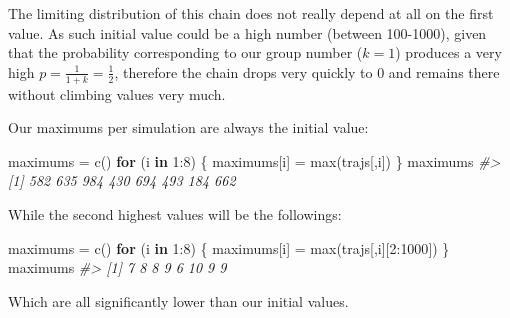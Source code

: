 \documentclass[
]{article}
\newenvironment{Shaded}{\begin{snugshade}}{\end{snugshade}}
\newcommand{\CommentTok}[1]{\textcolor[rgb]{0.56,0.35,0.01}{\textit{#1}}}
\newcommand{\ControlFlowTok}[1]{\textcolor[rgb]{0.13,0.29,0.53}{\textbf{#1}}}
\newcommand{\DecValTok}[1]{\textcolor[rgb]{0.00,0.00,0.81}{#1}}
\newcommand{\FunctionTok}[1]{\textcolor[rgb]{0.00,0.00,0.00}{#1}}
\newcommand{\NormalTok}[1]{#1}
\newcommand{\OtherTok}[1]{\textcolor[rgb]{0.56,0.35,0.01}{#1}}
\newcommand{\SpecialCharTok}[1]{\textcolor[rgb]{0.00,0.00,0.00}{#1}}
\begin{document}
The limiting distribution of this chain does not really depend at all on
the first value. As such initial value could be a high number (between
100-1000), given that the probability corresponding to our group number
(\(k=1\)) produces a very high \(p=\frac{1}{1+k} = \frac{1}{2}\),
therefore the chain drops very quickly to 0 and remains there without
climbing values very much.

Our maximums per simulation are always the initial value:

\begin{Shaded}
\begin{Highlighting}[]
\NormalTok{maximums }\OtherTok{=} \FunctionTok{c}\NormalTok{()}
\ControlFlowTok{for}\NormalTok{ (i }\ControlFlowTok{in} \DecValTok{1}\SpecialCharTok{:}\DecValTok{8}\NormalTok{) \{}
\NormalTok{    maximums[i] }\OtherTok{=} \FunctionTok{max}\NormalTok{(trajs[,i])}
\NormalTok{\}}
\NormalTok{maximums}
\CommentTok{\#\textgreater{} [1] 582 635 984 430 694 493 184 662}
\end{Highlighting}
\end{Shaded}

While the second highest values will be the followings:

\begin{Shaded}
\begin{Highlighting}[]
\NormalTok{maximums }\OtherTok{=} \FunctionTok{c}\NormalTok{()}
\ControlFlowTok{for}\NormalTok{ (i }\ControlFlowTok{in} \DecValTok{1}\SpecialCharTok{:}\DecValTok{8}\NormalTok{) \{}
\NormalTok{    maximums[i] }\OtherTok{=} \FunctionTok{max}\NormalTok{(trajs[,i][}\DecValTok{2}\SpecialCharTok{:}\DecValTok{1000}\NormalTok{])}
\NormalTok{\}}
\NormalTok{maximums}
\CommentTok{\#\textgreater{} [1]  7  8  8  9  6 10  9  9}
\end{Highlighting}
\end{Shaded}

Which are all significantly lower than our initial values.
\end{document}
